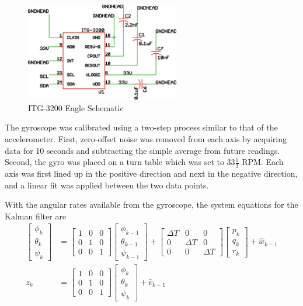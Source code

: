 \begin{figure}[h!]
  \caption{ITG-3200 Eagle Schematic} \label{itg3200Schematic}
  \centering
    \includegraphics[width=0.6\textwidth]{figures/itg3200Schematic.eps}
\end{figure}

The gyroscope was calibrated using a two-step process similar to that of the accelerometer. First, zero-offset noise was removed from each axis by acquiring data for 10 seconds and subtracting the simple average from future readings. Second, the gyro was placed on a turn table which was set to $33 \frac{1}{3}$ RPM. Each axis was first lined up in the positive direction and next in the negative direction, and a linear fit was applied between the two data points.

With the angular rates available from the gyroscope, the system equations for the Kalman filter are
\begin{align}
\begin{bmatrix}
\phi_{k}\\
\theta_{k}\\
\psi_{k}
\end{bmatrix} & = \begin{bmatrix}
1 & 0 & 0\\0 & 1 & 0\\0 & 0 & 1
\end{bmatrix}\begin{bmatrix}
\phi_{k-1}\\
\theta_{k-1}\\
\psi_{k-1}
\end{bmatrix}
+ \begin{bmatrix}
\Delta T & 0 & 0 \\ 0 & \Delta T & 0\\0 & 0 & \Delta T
\end{bmatrix}\begin{bmatrix} 
p_k \\ q_k \\ r_k 
\end{bmatrix}+\hat{w}_{k-1}\\
z_k & = \begin{bmatrix}
1 & 0 &0\\0&1&0\\0&0&1
\end{bmatrix}\begin{bmatrix}
\phi_{k}\\
\theta_{k}\\
\psi_{k}
\end{bmatrix}+\hat{v}_{k-1}
\end{align}

